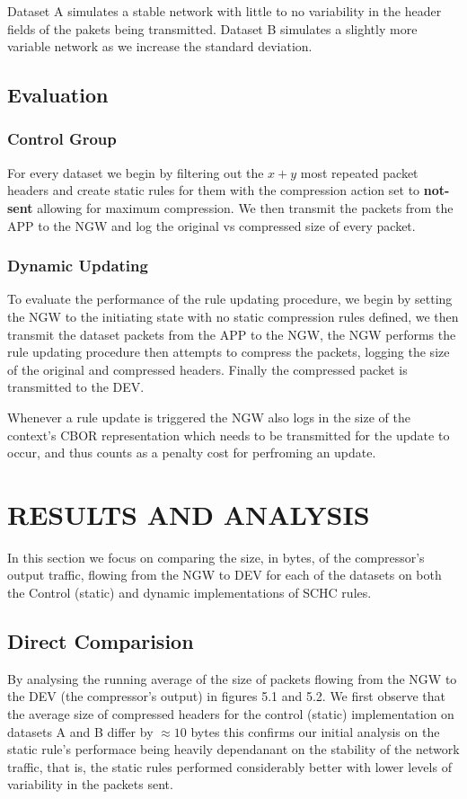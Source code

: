 \documentclass[12pt]{dalthesis}
\begin{document}
	Dataset A simulates a stable network with little to no variability in the header fields of the pakets being transmitted.
	Dataset B simulates a slightly more variable network as we increase the standard deviation.

	\section{Evaluation}
	\subsection{Control Group}
	\par{
		For every dataset we begin by filtering out the $x+y$ most repeated packet headers and create static rules for them with the compression action
		set to \textbf{not-sent} allowing for maximum compression. We then transmit the packets from the APP to the NGW and log the original vs compressed
		size of every packet. 
	}

	\subsection{Dynamic Updating}
	\par{
		To evaluate the performance of the rule updating procedure, we begin by setting the NGW to the initiating state with no static compression rules
		defined, we then transmit the dataset packets from the APP to the NGW, the NGW performs the rule updating procedure then attempts
		to compress the packets, logging the size of the original and compressed headers. Finally the compressed packet is transmitted to the DEV.

		Whenever a rule update is triggered the NGW also logs in the size of the context's CBOR representation which needs to be transmitted for 
		the update to occur, and
		thus counts as a penalty cost for perfroming an update.
	}


	\chapter{RESULTS AND ANALYSIS}
		In this section we focus on comparing the size, in bytes, of the compressor's output traffic, flowing from the NGW to DEV for each of 
		the datasets on both the Control (static) and dynamic implementations of SCHC rules. 

		\section{Direct Comparision}
		By analysing the running average of the size of packets flowing from the NGW to the DEV (the compressor's output) in figures 5.1 and 5.2. We first
		observe that the average size of compressed headers for the control (static) implementation on datasets A and B differ by $\approx 10$ bytes 
		this confirms our initial analysis on the static rule's performace being heavily dependanant on the stability of the network traffic, that is, the 
		static rules performed considerably better with lower levels of variability in the packets sent.
\end{document}
